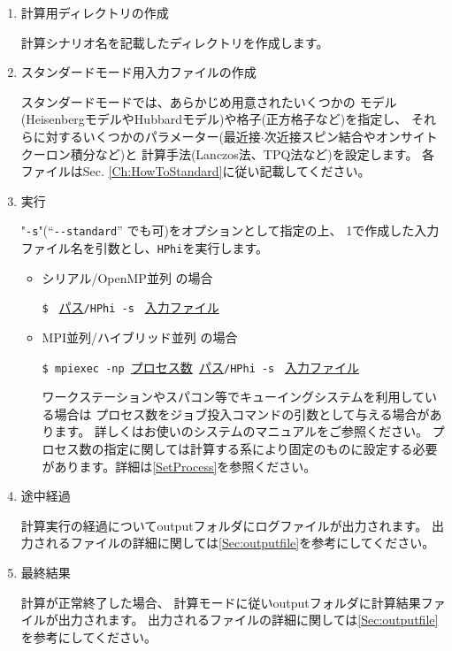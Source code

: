  \begin{enumerate}
   \item  計算用ディレクトリの作成

計算シナリオ名を記載したディレクトリを作成します。

   \item  スタンダードモード用入力ファイルの作成

スタンダードモードでは、あらかじめ用意されたいくつかの
モデル(HeisenbergモデルやHubbardモデル)や格子(正方格子など)を指定し、
それらに対するいくつかのパラメーター(最近接$\cdot$次近接スピン結合やオンサイトクーロン積分など)と
計算手法(Lanczos法、TPQ法など)を設定します。
各ファイルはSec. \ref{Ch:HowToStandard}に従い記載してください。

 \item  実行

"\verb|-s|"(``\verb|--standard|'' でも可)をオプションとして指定の上、
1で作成した入力ファイル名を引数とし、\verb|HPhi|を実行します。

\begin{itemize}
\item シリアル/OpenMP並列 の場合

  \verb|$ | \underline{パス}\verb|/HPhi -s | \underline{入力ファイル} 

\item MPI並列/ハイブリッド並列 の場合

  \verb|$ mpiexec -np |\underline{プロセス数}\verb| |\underline{パス}\verb|/HPhi -s | \underline{入力ファイル} 

  ワークステーションやスパコン等でキューイングシステムを利用している場合は
  プロセス数をジョブ投入コマンドの引数として与える場合があります。
  詳しくはお使いのシステムのマニュアルをご参照ください。
  {プロセス数の指定に関しては計算する系により固定のものに設定する必要があります。詳細は\ref{SetProcess}を参照ください。}

\end{itemize}

\item 途中経過

計算実行の経過についてoutputフォルダにログファイルが出力されます。
出力されるファイルの詳細に関しては\ref{Sec:outputfile}を参考にしてください。

\item 最終結果

計算が正常終了した場合、
計算モードに従いoutputフォルダに計算結果ファイルが出力されます。
出力されるファイルの詳細に関しては\ref{Sec:outputfile}を参考にしてください。
\end{enumerate}

